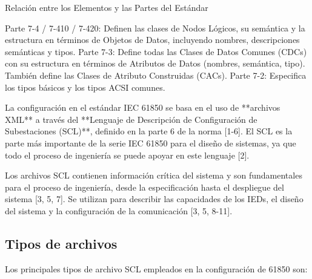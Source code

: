 \documentclass[a5paper]{book}%
\begin{document}
Relación entre los Elementos y las Partes del Estándar

    Parte 7-4 / 7-410 / 7-420: Definen las clases de Nodos Lógicos, su semántica y la estructura en términos de Objetos de Datos, incluyendo nombres, descripciones semánticas y tipos.
    Parte 7-3: Define todas las Clases de Datos Comunes (CDCs) con su estructura en términos de Atributos de Datos (nombres, semántica, tipo). También define las Clases de Atributo Construidas (CACs).
    Parte 7-2: Especifica los tipos básicos y los tipos ACSI comunes.


    La configuración en el estándar IEC 61850 se basa en el uso de **archivos XML** a través del **Lenguaje de Descripción de Configuración de Subestaciones (SCL)**, definido en la parte 6 de la norma [1-6]. El SCL es la parte más importante de la serie IEC 61850 para el diseño de sistemas, ya que todo el proceso de ingeniería se puede apoyar en este lenguaje [2].

Los archivos SCL contienen información crítica del sistema y son fundamentales para el proceso de ingeniería, desde la especificación hasta el despliegue del sistema [3, 5, 7]. Se utilizan para describir las capacidades de los IEDs, el diseño del sistema y la configuración de la comunicación [3, 5, 8-11].


\subsection{Tipos de archivos }

Los principales tipos de archivo SCL empleados en la configuración de 61850 son:
\end{document}
